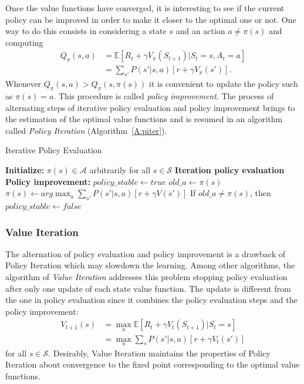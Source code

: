 Once the value functions have converged, it is interesting to see if the current policy can be improved in order to make it closer to the optimal one or not. One way to do this consists in considering a state $s$ and an action $a \neq \pi(s)$ and computing
\begin{align}
 Q_\pi(s,a) &= \mathbb{E}[R_t + \gamma V_\pi(S_{t+1}) | S_t = s, A_t = a]\nonumber\\
            &= \sum_{s'} P(s' | s,a)[r + \gamma V_\pi(s')].
\end{align}
Whenever $Q_\pi(s,a) > Q_\pi(s, \pi(s))$ it is convenient to update the policy such as $\pi(s) = a$. This procedure is called \textit{policy improvement}.
The process of alternating steps of iterative policy evaluation and policy improvement brings to the estimation of the optimal value functions and is resumed in an algorithm called \textit{Policy Iteration} (Algorithm~\ref{A:piter}).
\begin{algorithm}[t]
 \caption{Iterative Policy Evaluation}
 \begin{algorithmic}[1]\label{A:piter}
  \STATE \textbf{Initialize:} $\pi(s) \in \mathcal{A}$ arbitrarily for all $s \in \mathcal{S}$
  \REPEAT
  \STATE \textbf{Iteration policy evaluation}
  \STATE \textbf{Policy improvement:}
  \STATE $policy\_stable \leftarrow true$
  \STATE $old\_a \leftarrow \pi(s)$
  \STATE $\pi(s) \leftarrow arg\max_a \sum_{s'} P(s'|s,a)[r + \gamma V(s')]$
  \STATE If $old\_a \neq \pi(s)$, then $policy\_stable \leftarrow false$
  \ENDFOR
 \end{algorithmic}
\end{algorithm}

\subsubsection{Value Iteration}
The alternation of policy evaluation and policy improvement is a drawback of Policy Iteration which may slowdown the learning. Among other algorithms, the algorithm of \textit{Value Iteration} addresses this problem stopping policy evaluation after only one update of each state value function. The update is different from the one in policy evaluation since it combines the policy evaluation steps and the policy improvement:
\begin{align}
 V_{t+1} (s) &= \max_a \mathbb{E}[R_t + \gamma V_t(S_{t+1}) | S_t = s]\nonumber\\
             &= \max_a \sum_s P(s' | s, a)[r + \gamma V_t(s')]
\end{align}
for all $s \in \mathcal{S}$. Desirably, Value Iteration maintains the properties of Policy Iteration about convergence to the fixed point corresponding to the optimal value functions.

